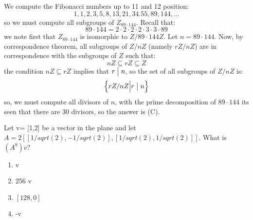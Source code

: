 \documentclass[12pt]{report}
\newcounter{it}
\theoremstyle{largebreak}
\newcommand\divides{\ensuremath{\bigm|}}
\begin{document}
    \begin{sol}
        We compute the Fibonacci numbers up to 11 and 12 position:
        \begin{equation*}
            1, 1, 2, 3, 5, 8, 13, 21, 34. 55, 89, 144,...
        \end{equation*}
        so we must compute all subgroups of $Z_{ 89\cdot 144}$. Recall that:
        \begin{equation*}
            89\cdot 144=2\cdot 2\cdot2\cdot 2\cdot 3\cdot 3\cdot 89 
        \end{equation*}
        we note first that $Z_{ 89\cdot 144}$ is isomorphic to $Z/{ 89\cdot 144}Z$. Let $n=89\cdot 144$. Now, by correspondence theorem, all subgroups of $Z/{n}Z$ (namely $rZ/nZ$) are in correspondence with the subgroups of $Z$ such that:
        \begin{equation*}
            nZ\subseteq rZ\subseteq Z
        \end{equation*}
        the condition $nZ\subseteq rZ$ implies that $r\divides n$, so the set of all subgroups of $Z/nZ$ is:
        \begin{equation*}
            \left\{rZ/nZ\Big|r\divides n \right\}
        \end{equation*}
        so, we must compute all divisors of $n$, with the prime decomposition of $89\cdot 144$ its seen that there are 30 divisors, so the answer is (C).
    \end{sol}

    \begin{excer}
        Let v= [1,2] be a vector in the plane and let $A = 2[[1/sqrt(2), - 1/sqrt(2)], [1/sqrt(2), 1/sqrt(2)]]$. What is $(A^8)v$?
        \begin{enumerate}[label = \textit{(\Alph*)}]
            \item v
            \item 256 v
            \item $[128, 0]$
            \item -v
        \end{enumerate}
    \end{excer}
\end{document}
